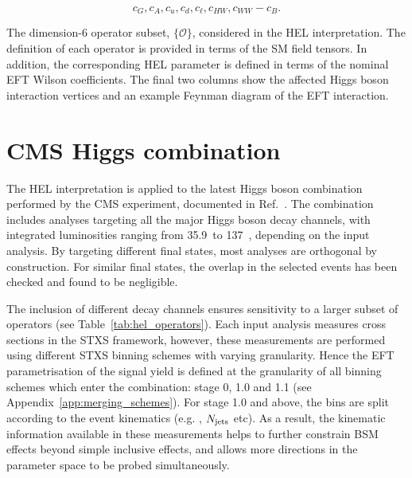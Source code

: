 \begin{equation}
    c_G, c_A, c_u, c_d, c_\ell, c_{HW}, c_{WW}-c_B.
\end{equation}

\begin{table}[htb!]
  \centering
  \scriptsize
  \renewcommand{\arraystretch}{2.5}
  \setlength{\tabcolsep}{3pt}
  \caption[Operator subset in the HEL interpretation]
  {
    The dimension-6 operator subset, $\{\mathcal{O}\}$, considered in the HEL interpretation. The definition of each operator is provided in terms of the SM field tensors. In addition, the corresponding HEL parameter is defined in terms of the nominal EFT Wilson coefficients. The final two columns show the affected Higgs boson interaction vertices and an example Feynman diagram of the EFT interaction. 
  }
  \label{tab:hel_operators}
  
\end{table}

\section{CMS Higgs combination}\label{sec:eft_combination}
The HEL interpretation is applied to the latest Higgs boson combination performed by the CMS experiment, documented in Ref.~\cite{CMS-PAS-HIG-19-005}. The combination includes analyses targeting all the major Higgs boson decay channels, with integrated luminosities ranging from 35.9~\fbinv to 137~\fbinv, depending on the input analysis. By targeting different final states, most analyses are orthogonal by construction. For similar final states, the overlap in the selected events has been checked and found to be negligible. 

The inclusion of different decay channels ensures sensitivity to a larger subset of operators (see Table~\ref{tab:hel_operators}). Each input analysis measures cross sections in the STXS framework, however, these measurements are performed using different STXS binning schemes with varying granularity.
Hence the EFT parametrisation of the signal yield is defined at the granularity of all binning schemes which enter the combination: stage 0, 1.0 and 1.1 (see Appendix~\ref{app:merging_schemes}). For stage 1.0 and above, the bins are split according to the event kinematics (e.g. \ptH, $N_{\rm{jets}}$ etc). As a result, the kinematic information available in these measurements helps to further constrain BSM effects beyond simple inclusive effects, and allows more directions in the parameter space to be probed simultaneously.

